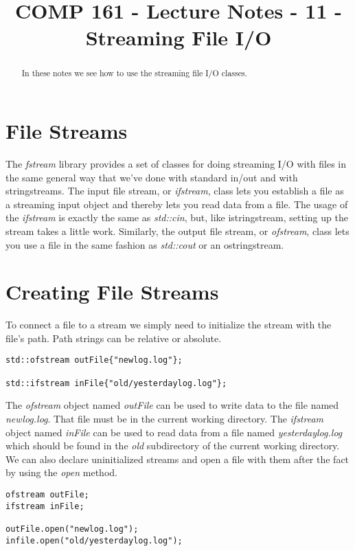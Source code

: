 \documentclass[]{tufte-handout}
\title{COMP 161 - Lecture Notes - 11 - Streaming File I/O}
\date{}
\begin{document}
 
\maketitle

\begin{abstract}
In these notes we see how to use the streaming file I/O classes. 
\end{abstract}

\section{File Streams}

The \textit{fstream} library provides a set of classes for doing streaming I/O with files in the same general way that we've done with standard in/out and with stringstreams. The input file stream, or \textit{ifstream}, class lets you establish a file as a streaming input object and thereby lets you read data from a file.  The usage of the \textit{ifstream} is exactly the same as \textit{std::cin}, but, like istringstream, setting up the stream takes a little work. Similarly, the output file stream, or \textit{ofstream}, class lets you use a file in the same fashion as \textit{std::cout} or an ostringstream.

\section{Creating File Streams}

To connect a file to a stream we simply need to initialize the stream with the file's path. Path strings can be relative or absolute.
\begin{verbatim}
std::ofstream outFile{"newlog.log"};

std::ifstream inFile{"old/yesterdaylog.log"};
\end{verbatim}
The \textit{ofstream} object named \textit{outFile} can be used to write data to the file named \textit{newlog.log}.  That file must be in the current working directory. The \textit{ifstream} object named \textit{inFile} can be used to read data from a file named \textit{yesterdaylog.log} which should be found in the \textit{old} subdirectory of the current working directory. We can also declare uninitialized streams and open a file with them after the fact by using the \textit{open } method.
\begin{verbatim}
ofstream outFile;
ifstream inFile;

outFile.open("newlog.log");
infile.open("old/yesterdaylog.log");
\end{verbatim}
\end{document}
